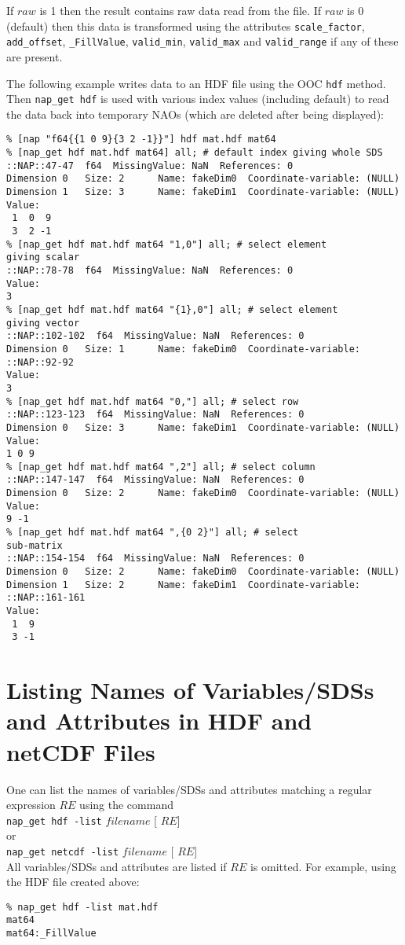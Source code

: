 If 
  $raw$ is 1 then the result contains raw data read from the
  file. If 
  $raw$ is 0 (default) then this data is transformed using the
  attributes 
  \texttt{scale\_factor}, 
  \texttt{add\_offset}, 
  \texttt{\_FillValue}, 
  \texttt{valid\_min}, 
  \texttt{valid\_max} and 
  \texttt{valid\_range} if any of these are present.
  

The following example writes data to an HDF file using the OOC 
  \texttt{hdf} method. Then 
  \texttt{nap\_get hdf} is used with various index values (including
  default) to read the data back into temporary NAOs (which are deleted
  after being displayed):
  \begin{verbatim}
% [nap "f64{{1 0 9}{3 2 -1}}"] hdf mat.hdf mat64
% [nap_get hdf mat.hdf mat64] all; # default index giving whole SDS
::NAP::47-47  f64  MissingValue: NaN  References: 0
Dimension 0   Size: 2      Name: fakeDim0  Coordinate-variable: (NULL)
Dimension 1   Size: 3      Name: fakeDim1  Coordinate-variable: (NULL)
Value:
 1  0  9
 3  2 -1
% [nap_get hdf mat.hdf mat64 "1,0"] all; # select element
giving scalar
::NAP::78-78  f64  MissingValue: NaN  References: 0
Value:
3
% [nap_get hdf mat.hdf mat64 "{1},0"] all; # select element
giving vector
::NAP::102-102  f64  MissingValue: NaN  References: 0
Dimension 0   Size: 1      Name: fakeDim0  Coordinate-variable:
::NAP::92-92
Value:
3
% [nap_get hdf mat.hdf mat64 "0,"] all; # select row
::NAP::123-123  f64  MissingValue: NaN  References: 0
Dimension 0   Size: 3      Name: fakeDim1  Coordinate-variable: (NULL)
Value:
1 0 9
% [nap_get hdf mat.hdf mat64 ",2"] all; # select column
::NAP::147-147  f64  MissingValue: NaN  References: 0
Dimension 0   Size: 2      Name: fakeDim0  Coordinate-variable: (NULL)
Value:
9 -1
% [nap_get hdf mat.hdf mat64 ",{0 2}"] all; # select
sub-matrix
::NAP::154-154  f64  MissingValue: NaN  References: 0
Dimension 0   Size: 2      Name: fakeDim0  Coordinate-variable: (NULL)
Dimension 1   Size: 2      Name: fakeDim1  Coordinate-variable:
::NAP::161-161
Value:
 1  9
 3 -1
\end{verbatim}

  \section{
    \label{Listing-Names}Listing Names of Variables/SDSs and Attributes in HDF and netCDF Files
  }
One can list the names of variables/SDSs and attributes matching
  a regular expression 
  $RE$ using the command
  \\
  \texttt{nap\_get hdf -list} 
  $filename$ [
  $RE$]
  \\or
  \\
  \texttt{nap\_get netcdf -list} 
  $filename$ [
  $RE$]
  \\All variables/SDSs and attributes are listed if 
  $RE$ is omitted. For example, using the HDF file created
  above:
  \begin{verbatim}
% nap_get hdf -list mat.hdf
mat64
mat64:_FillValue
\end{verbatim}

